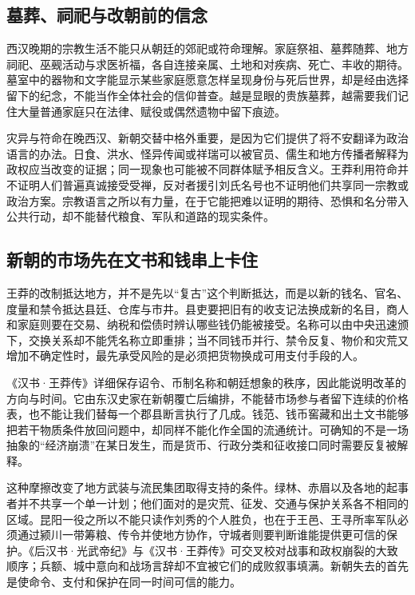 \subsection{墓葬、祠祀与改朝前的信念}

西汉晚期的宗教生活不能只从朝廷的郊祀或符命理解。家庭祭祖、墓葬随葬、地方祠祀、巫觋活动与求医祈福，各自连接亲属、土地和对疾病、死亡、丰收的期待。墓室中的器物和文字能显示某些家庭愿意怎样呈现身份与死后世界，却是经由选择留下的纪念，不能当作全体社会的信仰普查。越是显眼的贵族墓葬，越需要我们记住大量普通家庭只在法律、赋役或偶然遗物中留下痕迹。

灾异与符命在晚西汉、新朝交替中格外重要，是因为它们提供了将不安翻译为政治语言的办法。日食、洪水、怪异传闻或祥瑞可以被官员、儒生和地方传播者解释为政权应当改变的证据；同一现象也可能被不同群体赋予相反含义。王莽利用符命并不证明人们普遍真诚接受受禅，反对者援引刘氏名号也不证明他们共享同一宗教或政治方案。宗教语言之所以有力量，在于它能把难以证明的期待、恐惧和名分带入公共行动，却不能替代粮食、军队和道路的现实条件。

\subsection{新朝的市场先在文书和钱串上卡住}

王莽的改制抵达地方，并不是先以“复古”这个判断抵达，而是以新的钱名、官名、度量和禁令抵达县廷、仓库与市井。县吏要把旧有的收支记法换成新的名目，商人和家庭则要在交易、纳税和偿债时辨认哪些钱仍能被接受。名称可以由中央迅速颁下，交换关系却不能凭名称立即重排；当不同钱币并行、禁令反复、物价和灾荒又增加不确定性时，最先承受风险的是必须把货物换成可用支付手段的人。

《汉书·王莽传》详细保存诏令、币制名称和朝廷想象的秩序，因此能说明改革的方向与时间。它由东汉史家在新朝覆亡后编排，不能替市场参与者留下连续的价格表，也不能让我们替每一个郡县断言执行了几成。钱范、钱币窖藏和出土文书能够把若干物质条件放回问题中，却同样不能化作全国的流通统计。可确知的不是一场抽象的“经济崩溃”在某日发生，而是货币、行政分类和征收接口同时需要反复被解释。

这种摩擦改变了地方武装与流民集团取得支持的条件。绿林、赤眉以及各地的起事者并不共享一个单一计划；他们面对的是灾荒、征发、交通与保护关系各不相同的区域。昆阳一役之所以不能只读作刘秀的个人胜负，也在于王邑、王寻所率军队必须通过颍川一带筹粮、传令并使地方协作，守城者则要判断谁能提供更可信的保护。《后汉书·光武帝纪》与《汉书·王莽传》可交叉校对战事和政权崩裂的大致顺序；兵额、城中意向和战场言辞却不宜被它们的成败叙事填满。新朝失去的首先是使命令、支付和保护在同一时间可信的能力。

